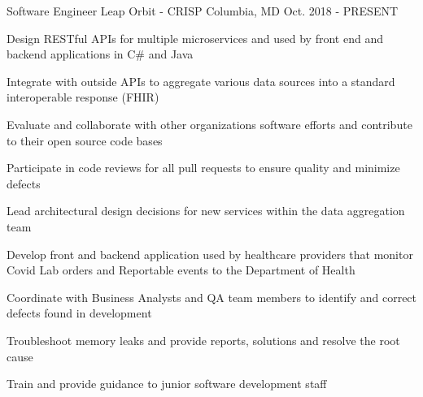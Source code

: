 

\begin{cventries}

  \cventry
  {Software Engineer} %
  {Leap Orbit - CRISP} %
  {Columbia, MD} %
  {Oct. 2018 - PRESENT} %
  {
    \begin{cvitems} %
      \item {Design RESTful APIs for multiple microservices and used by front end and backend applications in C# and Java}
      \item {Integrate with outside APIs to aggregate various data sources into a standard interoperable response (FHIR)}
      \item {Evaluate and collaborate with other organizations software efforts and contribute to their open source code bases}
      \item {Participate in code reviews for all pull requests to ensure quality and minimize defects}
      \item {Lead architectural design decisions for new services within the data aggregation team}
      \item {Develop front and backend application used by healthcare providers that monitor Covid Lab orders and Reportable events to the Department of Health}
      \item {Coordinate with Business Analysts and QA team members to identify and correct defects found in development}
      \item {Troubleshoot memory leaks and provide reports, solutions and resolve the root cause}
      \item {Train and provide guidance to junior software development staff}
    \end{cvitems}
  }


\end{cventries}
